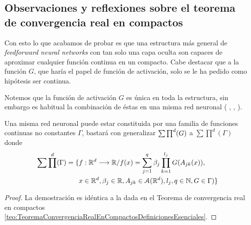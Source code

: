 \subsection{Observaciones y reflexiones sobre el teorema de convergencia real en compactos}

Con esto lo que acabamos de probar es que una estructura más general de \textit{feedforward neural networks} con tan solo una capa oculta  son capaces de aproximar cualquier 
función continua en un compacto.  Cabe destacar que a la función $G$, que haría el papel de función de activación,
 solo se le ha pedido como 
hipótesis ser continua.     


Notemos que la función de activación $G$ es única en toda la estructura,
sin embargo es habitual la combinación de éstas en una misma red neuronal (
\cite{DBLP:journals/corr/abs-1811-03378}, 
 \cite{8258768}, 
 \cite{DBLP:journals/corr/SzegedyVISW15}
). 
\reversemarginpar
{}
\normalmarginpar

\begin{aportacionOriginal}

\begin{corolario} 
    \label{cor:se-generaliza-G-a-una-familia}

    Una misma red neuronal puede estar constituida por una familia de funciones continuas no constantes $\Gamma$, 
    bastará con generalizar $\sum \prod^d (G)$ a $\sum \prod ^d (\Gamma)$ donde 
    \begin{equation}
        \begin{split}
            \sum \prod^d (\Gamma) = \{ 
                &f: \mathbb{R}^d \longrightarrow \mathbb{R} /
                f(x) = \sum_{j = 1} ^q  \beta_j \prod_{k=1}^{l_j}
                G(A_{jk}(x)), \\
                &x  \in \mathbb{R}^d, \beta_j \in \mathbb{R}, A_{jk}\in \mathcal{A}(\mathbb{R}^d), l_j,q \in \mathbb{N}, G \in \Gamma
                )
                \}
        \end{split}
    \end{equation}
\end{corolario}
\begin{proof}
    La demostración es idéntica a la dada en el Teorema de convergencia 
    real en compactos \ref{teo:TeoremaConvergenciaRealEnCompactosDefinicionesEsenciales}.
\end{proof}
\end{aportacionOriginal}

